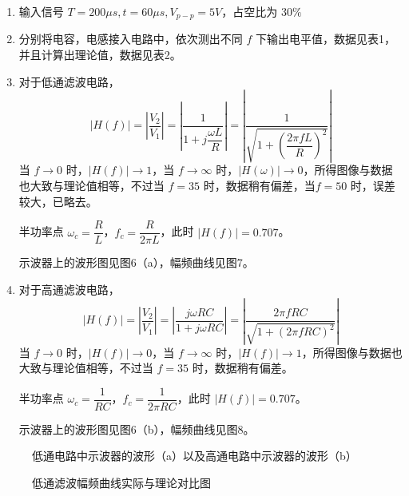 \documentclass[dvipsnames, svgnames,a4paper,11pt]{article}
\begin{document}
\begin{enumerate}
  \item 输入信号 $T = 200 \mu s, t = 60 \mu s, V_{p-p} = 5V$，占空比为 $30\%$
  \item 分别将电容，电感接入电路中，依次测出不同 $f$ 下输出电平值，数据见表1，并且计算出理论值，数据见表2。
  \item 对于低通滤波电路，
    \begin{equation}
      \left |H(f) \right | = \left |\dfrac{V_2}{V_1} \right | = \left |\dfrac{1}{1 + j\dfrac{\omega L}{R}}\right | = \left | \dfrac{1}{\sqrt{1 + (\dfrac{2\pi fL}{R})^2}} \right |
    \end{equation}
    当 $f \to 0$ 时，$\left |H(f) \right | \to 1$，当 $f \to \infty$ 时，$\left |H(\omega) \right | \to 0$，所得图像与数据也大致与理论值相等，不过当 $f = 35$ 时，数据稍有偏差，当$f = 50$ 时，误差较大，已略去。

    半功率点 $\omega_c = \dfrac{R}{L}$，$f_c = \dfrac{R}{2\pi L}$，此时 $|H(f)| = 0.707$。

    示波器上的波形图见图6（a），幅频曲线见图7。
  \item 对于高通滤波电路，
    \begin{equation}
      \left |H(f) \right | = \left |\dfrac{V_2}{V_1} \right | = \left |\dfrac{j\omega RC}{1 + j\omega RC}\right | = \left | \dfrac{2\pi fRC}{\sqrt{1 + (2\pi fRC)^2}} \right |
    \end{equation}
    当 $f \to 0$ 时，$\left |H(f) \right | \to 0$，当 $f \to \infty$ 时，$\left |H(f) \right | \to 1$，所得图像与数据也大致与理论值相等，不过当 $f = 35$ 时，数据稍有偏差。

    半功率点 $\omega_c = \dfrac{1}{RC}$，$f_c = \dfrac{1}{2\pi RC}$，此时 $|H(f)| = 0.707$。

    示波器上的波形图见图6（b），幅频曲线见图8。
\end{enumerate}

\begin{figure}[htbp]
	\centering

	\caption{低通电路中示波器的波形（a）以及高通电路中示波器的波形（b）}
\end{figure}

\begin{figure}[htbp]
  \centering

  \caption{低通滤波幅频曲线实际与理论对比图}
\end{figure}
\end{document}
